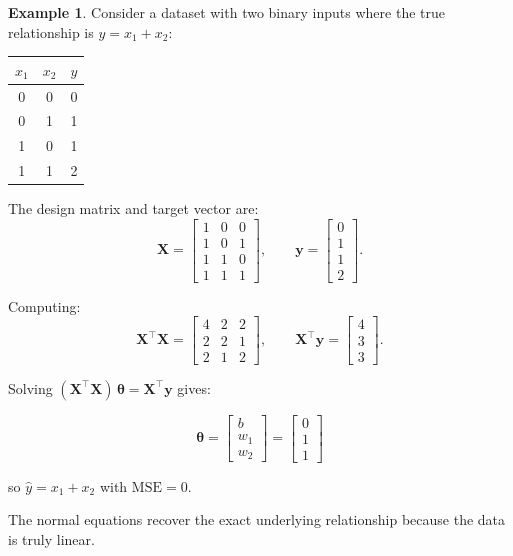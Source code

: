 \documentclass[12pt, a4paper]{article}
\newif\ifstudentmode
\newcommand{\sol}[2][6cm]{%
  \ifstudentmode
    \underline{\hspace{#1}}%
  \else
    {#2}%
  \fi
}
\newcommand{\soleq}[2][3cm]{%
  \ifstudentmode
    \par\vspace{4pt}%
    \noindent\rule{\linewidth}{0.5pt}\\[#1]%
    \noindent\rule{\linewidth}{0.5pt}%
    \par\vspace{4pt}%
  \else
    \[#2\]%
  \fi
}
\theoremstyle{definition}
\newtheorem{example}{Example}[section]
\newcommand{\bth}{\boldsymbol{\theta}}
\newcommand{\bX}{\mathbf{X}}
\newcommand{\by}{\mathbf{y}}
\newcommand{\yhat}{\hat{y}}
\begin{document}
\begin{example}
Consider a dataset with two binary inputs where the true relationship is
$y = x_1 + x_2$:

\begin{center}
\begin{tabular}{ccc}
\toprule
$x_1$ & $x_2$ & $y$ \\
\midrule
0 & 0 & 0 \\
0 & 1 & 1 \\
1 & 0 & 1 \\
1 & 1 & 2 \\
\bottomrule
\end{tabular}
\end{center}

The design matrix and target vector are:
\[
  \bX =
  \begin{bmatrix} 1 & 0 & 0 \\ 1 & 0 & 1 \\ 1 & 1 & 0 \\ 1 & 1 & 1 \end{bmatrix},
  \qquad
  \by =
  \begin{bmatrix} 0 \\ 1 \\ 1 \\ 2 \end{bmatrix}.
\]

Computing:
\[
  \bX^{\top}\bX =
  \begin{bmatrix} 4 & 2 & 2 \\ 2 & 2 & 1 \\ 2 & 1 & 2 \end{bmatrix},
  \qquad
  \bX^{\top}\by =
  \begin{bmatrix} 4 \\ 3 \\ 3 \end{bmatrix}.
\]

Solving $(\bX^{\top}\bX)\,\bth = \bX^{\top}\by$ gives:

\soleq[2.5cm]{%
  \bth =
  \begin{bmatrix} b \\ w_1 \\ w_2 \end{bmatrix}
  =
  \begin{bmatrix} 0 \\ 1 \\ 1 \end{bmatrix}
}

so $\yhat = \sol{x_1 + x_2}$ with $\mathrm{MSE} = \sol[2cm]{0}$.

The normal equations recover the exact underlying relationship because the
data is truly linear.
\end{example}
\end{document}
